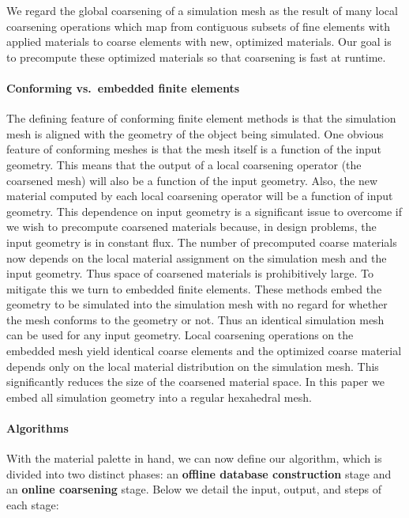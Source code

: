 We regard the global coarsening of a simulation mesh as the result of many local coarsening operations which map from contiguous subsets of fine elements with applied materials to coarse elements with new, optimized materials.
Our goal is to precompute these optimized materials so that coarsening is fast at runtime.


\paragraph{Conforming vs.~embedded finite elements}
The defining feature of conforming finite element methods is that the simulation mesh is aligned with the geometry of the object being simulated. One obvious feature of conforming meshes is that the mesh itself is a function of the input geometry. This means that the output of a local coarsening operator (the coarsened mesh) will also be a function of the input geometry. Also, the new material computed by each local coarsening operator will be a function of input geometry. This dependence on input geometry is a significant issue to overcome if we wish to precompute coarsened materials because, in design problems, the input geometry is in constant flux. The number of precomputed coarse materials now depends on the local material assignment on the simulation mesh and the input geometry. Thus space of coarsened materials is prohibitively large. 
To mitigate this we turn to embedded finite elements. These methods embed the geometry to be simulated into the simulation mesh with no regard for whether the mesh conforms to the geometry or not. Thus an identical simulation mesh can be used for any input geometry. Local coarsening operations on the embedded mesh yield identical coarse elements and the optimized coarse material depends only on the local material distribution on the simulation mesh.  This significantly reduces the size of the coarsened material space. In this paper we embed all simulation geometry into a regular hexahedral mesh.

\paragraph{Algorithms}
With the material palette in hand, we can now define our algorithm, which is divided into two distinct phases: an \textbf{offline database construction} stage and an \textbf{online coarsening} stage.  Below we detail the input, output, and steps of each stage:

